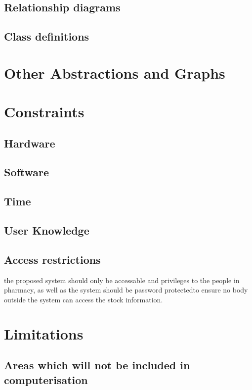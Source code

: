 \subsection{Relationship diagrams}

\subsection{Class definitions}

\section{Other Abstractions and Graphs}

\section{Constraints}

\subsection{Hardware}

\subsection{Software}

\subsection{Time}

\subsection{User Knowledge}

\subsection{Access restrictions}
the proposed system should only be accessable and privileges to the people in pharmacy, as well as the system should be password protectedto ensure no body outside the system can access the stock information.
\space

\section{Limitations}


\subsection{Areas which will not be included in computerisation}

